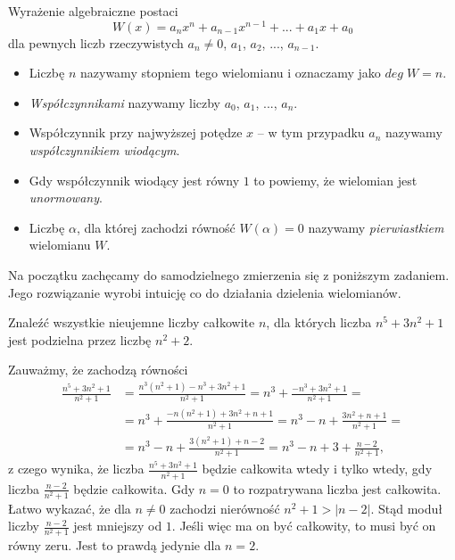 


\noindent
Wyrażenie algebraiczne postaci
\[
    W(x) = a_nx^n + a_{n - 1}x^{n - 1} + ... + a_1x + a_0
\]
dla pewnych liczb rzeczywistych $a_n \neq 0$, $a_1$, $a_2$, ..., $a_{n - 1}$.
\begin{itemize}
    \item Liczbę $n$ nazywamy stopniem tego wielomianu i oznaczamy jako $deg \; W = n$.

    \item \textit{Współczynnikami} nazywamy liczby $a_0$, $a_1$, ..., $a_n$.

    \item Współczynnik przy najwyższej potędze $x$ -- w tym przypadku $a_n$ nazywamy \textit{współczynnikiem wiodącym}.

    \item Gdy współczynnik wiodący jest równy $1$ to powiemy, że wielomian jest \textit{unormowany}.

    \item Liczbę $\alpha$, dla której zachodzi równość $W(\alpha) = 0$ nazywamy \textit{pierwiastkiem} wielomianu $W$.
\end{itemize}

\vspace{5px}

\noindent 
Na początku zachęcamy do samodzielnego zmierzenia się z poniższym zadaniem. Jego rozwiązanie wyrobi intuicję co do działania dzielenia wielomianów.

\vspace{5px}


\noindent
Znaleźć wszystkie nieujemne liczby całkowite $n$, dla których liczba $n^5 + 3n^2 + 1$ jest podzielna przez liczbę $n^2 + 2$.

\vspace{5px}


\noindent
Zauważmy, że zachodzą równości
\begin{align*}
    \frac{n^5 + 3n^2 + 1}{n^2 + 1} &= 
    \frac{n^3(n^2 + 1) - n^3 + 3n^2 + 1}{n^2 + 1} 
    = n^3 + \frac{- n^3 + 3n^2 + 1}{n^2 + 1} = \\
    &= n^3 + \frac{-n(n^2 + 1) + 3n^2 + n + 1}{n^2 + 1} 
    = n^3 - n + \frac{3n^2 + n + 1}{n^2 + 1} = \\
    &= n^3 - n + \frac{3(n^2 + 1) + n - 2}{n^2 + 1}
    =  n^3 - n + 3 + \frac{n - 2}{n^2 + 1}, 
\end{align*} 
z czego wynika, że liczba $\frac{n^5 + 3n^2 + 1}{n^2 + 1}$ będzie całkowita wtedy i tylko wtedy, gdy liczba $\frac{n - 2}{n^2 + 1}$ będzie całkowita. Gdy $n = 0$ to rozpatrywana liczba jest całkowita. Łatwo wykazać, że dla $n \neq 0$ zachodzi nierówność $n^2 + 1 > |n - 2|$. Stąd moduł liczby $\frac{n - 2}{n^2 + 1}$ jest mniejszy od $1$. Jeśli więc ma on być całkowity, to musi być on równy zeru. Jest to prawdą jedynie dla $n = 2$.

